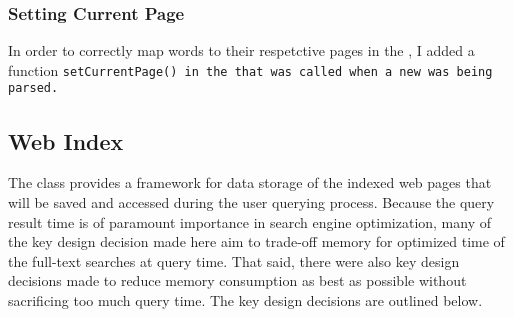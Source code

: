 \documentclass[11pt]{article}
\begin{document}
\subsubsection{Setting Current Page}
In order to correctly map words to their respetctive pages in the \WI{}, I added a function \tt{setCurrentPage()} in the \CMH{} that was called when a new \Page{} was being parsed. 

\subsection{Web Index}
The \WI{} class provides a framework for data storage of the indexed web pages that will be saved and accessed during the user querying process. Because the query result time is of paramount importance in search engine optimization, many of the key design decision made here aim to trade-off memory for optimized time of the full-text searches at query time. That said, there were also key design decisions made to reduce memory consumption as best as possible without sacrificing too much query time. The key design decisions are outlined below.
\end{document}

